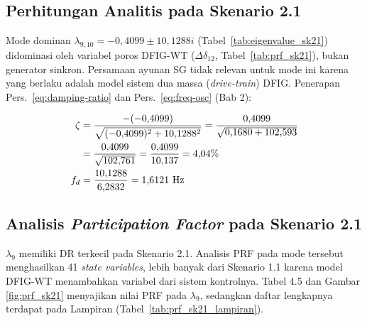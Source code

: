 \subsection{Perhitungan Analitis pada Skenario 2.1}

Mode dominan $\lambda_{9,10} = -0{,}4099 \pm 10{,}1288i$
(Tabel~\ref{tab:eigenvalue_sk21}) didominasi oleh variabel poros DFIG-WT
($\Delta\delta_{12}$, Tabel~\ref{tab:prf_sk21}), bukan generator sinkron.
Persamaan ayunan SG tidak relevan untuk mode ini karena yang berlaku adalah
model sistem dua massa (\textit{drive-train}) DFIG. Penerapan
Pers.~\ref{eq:damping-ratio} dan Pers.~\ref{eq:freq-osc} (Bab 2):

\begin{align}
    \zeta &= \frac{-(-0{,}4099)}{\sqrt{(-0{,}4099)^2 + 10{,}1288^2}}
           = \frac{0{,}4099}{\sqrt{0{,}1680 + 102{,}593}} \notag \\
          &= \frac{0{,}4099}{\sqrt{102{,}761}}
           = \frac{0{,}4099}{10{,}137} = 4{,}04\% \\
    f_d   &= \frac{10{,}1288}{6{,}2832} = 1{,}6121 \text{ Hz}
\end{align}

\subsection{Analisis \textit{Participation Factor} pada Skenario 2.1}

$\lambda_9$ memiliki DR terkecil pada Skenario 2.1. Analisis PRF pada mode
tersebut menghasilkan 41 \textit{state variables}, lebih banyak dari Skenario
1.1 karena model DFIG-WT menambahkan variabel dari sistem kontrolnya. Tabel 4.5 dan Gambar \ref{fig:prf_sk21}
menyajikan nilai PRF pada $\lambda_9$, sedangkan daftar lengkapnya terdapat pada
Lampiran (Tabel~\ref{tab:prf_sk21_lampiran}).

